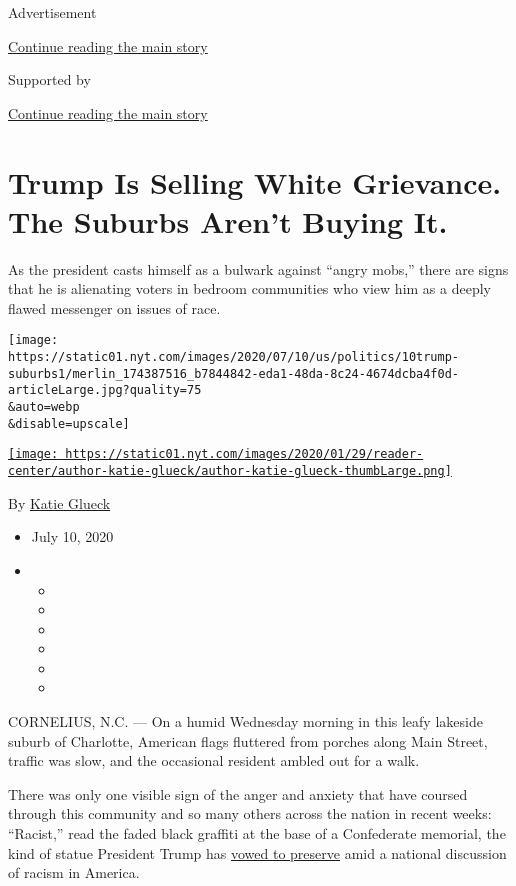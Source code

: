 Advertisement

\protect\hyperlink{after-top}{Continue reading the main story}

Supported by

\protect\hyperlink{after-sponsor}{Continue reading the main story}

\hypertarget{trump-is-selling-white-grievance-the-suburbs-arent-buying-it}{%
\section{Trump Is Selling White Grievance. The Suburbs Aren't Buying
It.}\label{trump-is-selling-white-grievance-the-suburbs-arent-buying-it}}

As the president casts himself as a bulwark against ``angry mobs,''
there are signs that he is alienating voters in bedroom communities who
view him as a deeply flawed messenger on issues of race.

\texttt{[image: https://static01.nyt.com/images/2020/07/10/us/politics/10trump-suburbs1/merlin\_174387516\_b7844842-eda1-48da-8c24-4674dcba4f0d-articleLarge.jpg?quality=75\\\&auto=webp\\\&disable=upscale]}

\href{https://www.nytimes.com/by/katie-glueck}{\texttt{[image: https://static01.nyt.com/images/2020/01/29/reader-center/author-katie-glueck/author-katie-glueck-thumbLarge.png]}}

By \href{https://www.nytimes.com/by/katie-glueck}{Katie Glueck}

\begin{itemize}
\item
  July 10, 2020
\item
  \begin{itemize}
  \item
  \item
  \item
  \item
  \item
  \item
  \end{itemize}
\end{itemize}

CORNELIUS, N.C. --- On a humid Wednesday morning in this leafy lakeside
suburb of Charlotte, American flags fluttered from porches along Main
Street, traffic was slow, and the occasional resident ambled out for a
walk.

There was only one visible sign of the anger and anxiety that have
coursed through this community and so many others across the nation in
recent weeks: ``Racist,'' read the faded black graffiti at the base of a
Confederate memorial, the kind of statue President Trump has
\href{https://www.nytimes.com/2020/06/26/us/politics/trump-monuments-executive-order.html}{vowed
to preserve} amid a national discussion of racism in America.


